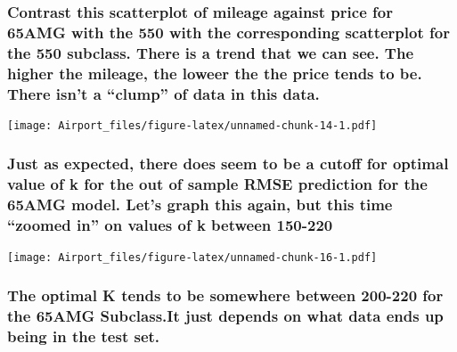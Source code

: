 \documentclass[]{article}
\begin{document}
\hypertarget{contrast-this-scatterplot-of-mileage-against-price-for-65amg-with-the-550-with-the-corresponding-scatterplot-for-the-550-subclass.-there-is-a-trend-that-we-can-see.-the-higher-the-mileage-the-loweer-the-the-price-tends-to-be.-there-isnt-a-clump-of-data-in-this-data.}{%
\subsubsection{Contrast this scatterplot of mileage against price for
65AMG with the 550 with the corresponding scatterplot for the 550
subclass. There is a trend that we can see. The higher the mileage, the
loweer the the price tends to be. There isn't a ``clump'' of data in
this
data.}\label{contrast-this-scatterplot-of-mileage-against-price-for-65amg-with-the-550-with-the-corresponding-scatterplot-for-the-550-subclass.-there-is-a-trend-that-we-can-see.-the-higher-the-mileage-the-loweer-the-the-price-tends-to-be.-there-isnt-a-clump-of-data-in-this-data.}}

\texttt{[image: Airport\_files/figure-latex/unnamed-chunk-14-1.pdf]}

\hypertarget{just-as-expected-there-does-seem-to-be-a-cutoff-for-optimal-value-of-k-for-the-out-of-sample-rmse-prediction-for-the-65amg-model.-lets-graph-this-again-but-this-time-zoomed-in-on-values-of-k-between-150-220}{%
\subsubsection{Just as expected, there does seem to be a cutoff for
optimal value of k for the out of sample RMSE prediction for the 65AMG
model. Let's graph this again, but this time ``zoomed in'' on values of
k between
150-220}\label{just-as-expected-there-does-seem-to-be-a-cutoff-for-optimal-value-of-k-for-the-out-of-sample-rmse-prediction-for-the-65amg-model.-lets-graph-this-again-but-this-time-zoomed-in-on-values-of-k-between-150-220}}

\texttt{[image: Airport\_files/figure-latex/unnamed-chunk-16-1.pdf]}

\hypertarget{the-optimal-k-tends-to-be-somewhere-between-200-220-for-the-65amg-subclass.it-just-depends-on-what-data-ends-up-being-in-the-test-set.}{%
\subsubsection{The optimal K tends to be somewhere between 200-220 for
the 65AMG Subclass.It just depends on what data ends up being in the
test
set.}\label{the-optimal-k-tends-to-be-somewhere-between-200-220-for-the-65amg-subclass.it-just-depends-on-what-data-ends-up-being-in-the-test-set.}}
\end{document}
